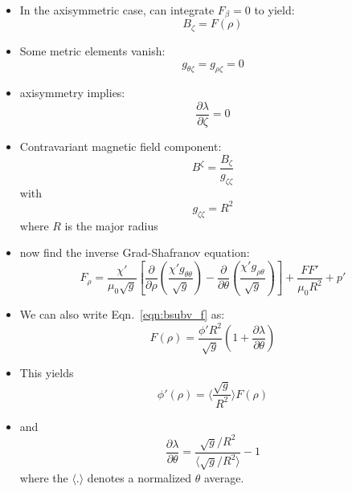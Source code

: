 \begin{itemize}

\item
In the axisymmetric case, can integrate $F_\beta = 0$ to yield:
\begin{equation}
 B_\zeta = F(\rho) \label{eqn:bsubv_f}
\end{equation}

\item
Some metric elements vanish:
\begin{equation}
 g_{\theta \zeta} = g_{\rho \zeta} = 0
\end{equation}

\item
axisymmetry implies:
\begin{equation}
 \frac{\partial \lambda}{\partial \zeta} = 0
\end{equation}

\item
Contravariant magnetic field component:
\begin{equation}
 B^\zeta = \frac{B_\zeta}{g_{\zeta \zeta}}
\end{equation}
with
\begin{equation}
 g_{\zeta \zeta} = R^2
\end{equation}
where $R$ is the major radius

\item
now find the inverse Grad-Shafranov equation:
\begin{equation}
 F_\rho = \frac{\chi'}{\mu_0 \sqrt{g}}
 \left[
   \frac{\partial}{\partial \rho  } \left( \frac{\chi' g_{\theta \theta}}{\sqrt{g}} \right) -
   \frac{\partial}{\partial \theta} \left( \frac{\chi' g_{\rho   \theta}}{\sqrt{g}} \right)
 \right]
 + \frac{F F'}{\mu_0 R^2}
 + p'
\end{equation}

\item
We can also write Eqn.~\ref{eqn:bsubv_f} as:
\begin{equation}
 F(\rho) = \frac{\phi' R^2}{\sqrt{g}} \left( 1 + \frac{\partial \lambda}{\partial \theta} \right)
\end{equation}

\item
This yields
\begin{equation}
 \phi'(\rho) = \langle \frac{\sqrt{g}}{R^2} \rangle F(\rho)
\end{equation}

\item
and
\begin{equation}
 \frac{\partial \lambda}{\partial \theta}
 = \frac{\sqrt{g} / R^2}{\langle \sqrt{g} / R^2 \rangle} - 1
\end{equation}
where the $\langle . \rangle$ denotes a normalized $\theta$ average.

\end{itemize}


